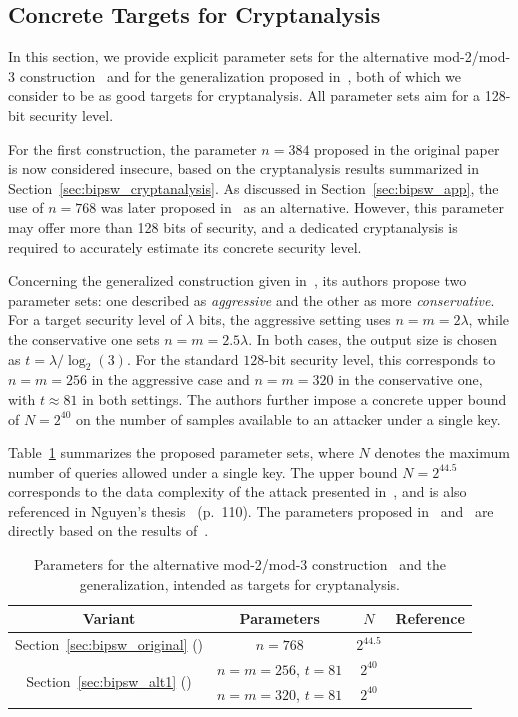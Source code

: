 \subsection{Concrete Targets for Cryptanalysis}
In this section, we provide explicit parameter sets for the alternative mod-2/mod-3 construction~\cite{TCC:BIPSW18} and for the generalization proposed in~\cite{C:DGHIKS21}, both of which we consider to be as good targets for cryptanalysis. All parameter sets aim for a 128-bit security level.

For the first construction, the parameter $n = 384$ proposed in the original paper is now considered insecure, based on the cryptanalysis results summarized in Section~\ref{sec:bipsw_cryptanalysis}. As discussed in Section~\ref{sec:bipsw_app}, the use of $n = 768$ was later proposed in~\cite{AC:CDDKS24} as an alternative. However, this parameter may offer more than 128 bits of security, and a dedicated cryptanalysis is required to accurately estimate its concrete security level.

Concerning the generalized construction given in~\cite{C:DGHIKS21}, its authors propose two parameter sets: one described as \emph{aggressive} and the other as more \emph{conservative}. For a target security level of $\lambda$ bits, the aggressive setting uses $n = m = 2\lambda$, while the conservative one sets $n = m = 2.5\lambda$. In both cases, the output size is chosen as $t = \lambda / \log_2(3)$. For the standard $128$-bit security level, this corresponds to $n = m = 256$ in the aggressive case and $n = m = 320$ in the conservative one, with $t \approx 81$ in both settings. The authors further impose a concrete upper bound of $N = 2^{40}$ on the number of samples available to an attacker under a single key.


Table~\ref{tab:parameters_bipsw} summarizes the proposed parameter sets, where \( N \) denotes the maximum number of queries allowed under a single key. The upper bound \( N = 2^{44.5} \) corresponds to the data complexity of the attack presented in~\cite{JMN23}, and is also referenced in Nguyen’s thesis~\cite{nguyen2025} (p.~110). The parameters proposed in~\cite{AC:CDDKS24} and~\cite{EC:BCMPR24} are directly based on the results of~\cite{JMN23}.



\begin{table}[!ht]
\centering
\begin{tabular}{cccc}
\toprule
Variant & Parameters & $N$ & Reference \\
\midrule
Section~\ref{sec:bipsw_original} (\cite{TCC:BIPSW18}) &$n = 768$& $2^{44.5}$ & \cite{AC:CDDKS24,JMN23,nguyen2025}\\
\midrule
\multirow{2}{*}{Section~\ref{sec:bipsw_alt1} (\cite{C:DGHIKS21})}& $n = m = 256$, $t = 81$ & $2^{40}$ & \multirow{2}{*}{\cite{C:DGHIKS21}}\\
& $n = m = 320$, $t = 81$  & $2^{40}$ & \\
\bottomrule
\end{tabular}
\caption{\label{tab:parameters_bipsw}Parameters for the alternative mod-2/mod-3 construction~\cite{TCC:BIPSW18} and the  \cite{C:DGHIKS21} generalization, intended as targets for cryptanalysis. }
\end{table}

